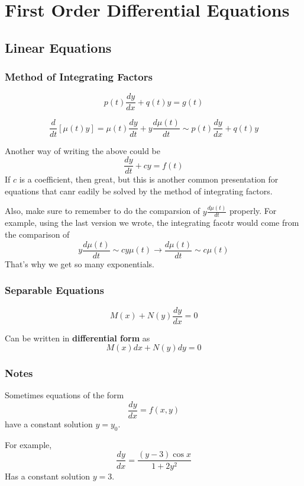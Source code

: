 \section{First Order Differential Equations}

\subsection{Linear Equations}

\subsubsection{Method of Integrating Factors}


$$
p(t) \frac{dy}{dx} + q(t)y = g(t)
$$

$$
\frac{d}{dt} \left[ \mu(t)y \right] =
\mu(t) \frac{dy}{dt} + y \frac{d\mu(t)}{dt} \sim p(t) \frac{dy}{dx} + q(t)y
$$

Another way of writing the above could be
$$
\frac{dy}{dt} + cy = f(t)
$$
If $c$ is a coefficient, then great, but this is another common presentation for equations
that canr eadily be solved by the method of integrating factors.

Also, make sure to remember to do the comparsion of $y \frac{d\mu(t)}{dt}$ properly.
For example, using the last version we wrote, the integrating facotr would come from the comparison of
$$
y \frac{d\mu(t)}{dt} \sim cy\mu(t) \rightarrow \frac{d\mu(t)}{dt} \sim c\mu(t)
$$
That's why we get so many exponentials.

\subsubsection{Separable Equations}

$$
M(x) + N(y) \frac{dy}{dx} = 0
$$

Can be written in \textbf{differential form} as
$$
M(x)dx + N(y)dy = 0
$$


\subsubsection{Notes}

Sometimes equations of the form
$$
\frac{dy}{dx} = f(x,y)
$$
have a constant solution $y = y_0$.

For example,
$$
\frac{dy}{dx} = \frac{(y-3) \cos{x}}{1+2y^2}
$$
Has a constant solution $y=3$.
\\





